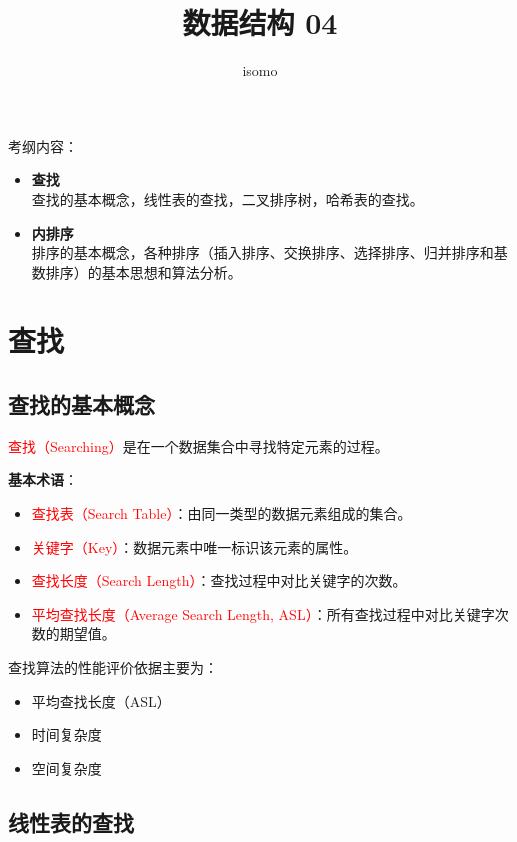 \documentclass{../../note}
\title{数据结构 04}
\author{isomo}
\begin{document}
\maketitle

考纲内容：

\begin{itemize}

  \item \textbf{查找}\\
    查找的基本概念，线性表的查找，二叉排序树，哈希表的查找。

  \item \textbf{内排序}\\
    排序的基本概念，各种排序（插入排序、交换排序、选择排序、归并排序和基数排序）的基本思想和算法分析。
\end{itemize}

\section{查找}

\subsection{查找的基本概念}
\textcolor{red}{查找（Searching）}是在一个数据集合中寻找特定元素的过程。

\textbf{基本术语}：
\begin{itemize}
  \item \textcolor{red}{查找表（Search Table）}：由同一类型的数据元素组成的集合。
  \item \textcolor{red}{关键字（Key）}：数据元素中唯一标识该元素的属性。
  \item \textcolor{red}{查找长度（Search Length）}：查找过程中对比关键字的次数。
  \item \textcolor{red}{平均查找长度（Average Search Length, ASL）}：所有查找过程中对比关键字次数的期望值。
\end{itemize}

查找算法的性能评价依据主要为：
\begin{itemize}
  \item 平均查找长度（ASL）
  \item 时间复杂度
  \item 空间复杂度
\end{itemize}

\subsection{线性表的查找}
\end{document}
